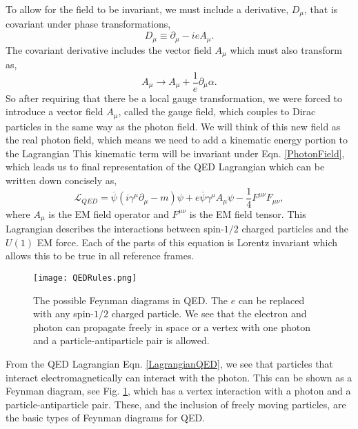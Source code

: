 To allow for the field to be invariant, we must include a derivative, $D_\mu$, that is covariant under phase transformations,
 \begin{equation}\label{QEDCovariantD}
 D_\mu\equiv\partial_\mu-ieA_\mu.
 \end{equation}
 The covariant derivative includes the vector field $A_\mu$ which must also transform as,
  \begin{equation}\label{PhotonField}
 A_\mu\rightarrow A_\mu+\frac{1}{e}\partial_\mu\alpha.
 \end{equation}
 So after requiring that there be a local gauge transformation, we were forced to introduce a vector field $A_\mu$, called the gauge field, which couples to Dirac particles in the same way as the photon field. We will think of this new field as the real photon field, which means we need to add a kinematic energy portion to the Lagrangian This kinematic term will be invariant under Eqn. \ref{PhotonField}, which leads us to final representation of the QED Lagrangian which can be written down concisely as, 
\begin{equation}\label{LagrangianQED}
\mathcal{L}_{QED}=\overline{\psi}(i\gamma^\mu\partial_\mu-m)\psi+e\overline{\psi}\gamma^{\mu}A_{\mu}\psi-\frac{1}{4}F^{\mu\nu}F_{\mu\nu},
\end{equation}
where $A_{\mu}$ is the EM field operator and $F^{\mu\nu}$ is the EM field tensor. This Lagrangian describes the interactions between spin-$1/2$ charged particles and the $U(1)$ EM force. Each of the parts of this equation is Lorentz invariant which allows this to be true in all reference frames. 

\begin{figure}
 	\centering
	\texttt{[image: QEDRules.png]}
 	\caption[QED Feynman Diagrams]{The possible Feynman diagrams in QED. The $e$ can be replaced with any spin-$1/2$ charged particle. We see that the electron and photon can propagate freely in space or a vertex with one photon and a particle-antiparticle pair is allowed.}
 	\label{QEDRules} 
\end{figure}

From the QED Lagrangian Eqn. \ref{LagrangianQED}, we see that particles that interact electromagnetically can interact with the photon. This can be shown as a Feynman diagram, see Fig. \ref{QEDRules}, which has a vertex interaction with a photon and a particle-antiparticle pair. These, and the inclusion of freely moving particles, are the basic types of Feynman diagrams for QED. 

